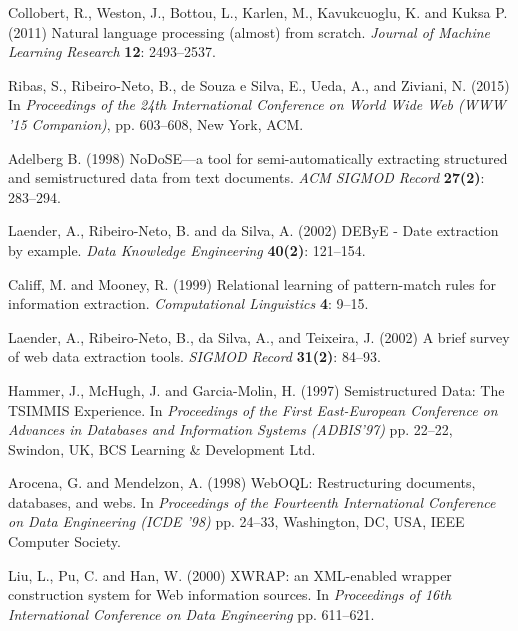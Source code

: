 \documentclass{nle}
\begin{document}
\begin{thebibliography}{}
Collobert, R., Weston, J., Bottou, L., Karlen, M., Kavukcuoglu, K. and Kuksa P. (2011)
Natural language processing (almost) from scratch.
{\it Journal of Machine Learning Research}
{\bf 12}: 2493--2537.

Ribas, S., Ribeiro-Neto, B., de Souza e Silva, E., Ueda, A., and Ziviani, N. (2015)
In {\it Proceedings of the 24th International Conference on World Wide Web (WWW '15 Companion)}, 
pp. 603--608, New York, ACM.

Adelberg B. (1998)
NoDoSE---a tool for semi-automatically extracting structured and semistructured data from text documents.
{\it ACM SIGMOD Record} 
{\bf 27(2)}: 283--294.

Laender, A., Ribeiro-Neto, B. and da Silva, A. (2002)
DEByE - Date extraction by example.
{\it Data Knowledge Engineering}
{\bf 40(2)}: 121--154.

Califf, M. and Mooney, R. (1999)
Relational learning of pattern-match rules for information extraction.
{\it Computational Linguistics}
{\bf 4}: 9--15.

Laender, A., Ribeiro-Neto, B., da Silva, A., and Teixeira, J. (2002)
A brief survey of web data extraction tools.
{\it SIGMOD Record}
{\bf 31(2)}: 84--93.

Hammer, J., McHugh, J. and Garcia-Molin, H. (1997)
Semistructured Data: The TSIMMIS Experience.
In {\it Proceedings of the First East-European Conference on Advances in Databases and Information Systems (ADBIS'97)}
pp. 22--22, Swindon, UK, BCS Learning \& Development Ltd.

Arocena, G. and Mendelzon, A. (1998)
WebOQL: Restructuring documents, databases, and webs.
In {\it Proceedings of the Fourteenth International Conference on Data Engineering (ICDE '98)}
pp. 24--33, Washington, DC, USA, IEEE Computer Society.

Liu, L., Pu, C. and Han, W. (2000)
XWRAP: an XML-enabled wrapper construction system for Web information sources.
In {\it Proceedings of 16th International Conference on Data Engineering}
pp. 611--621.


\end{thebibliography}
\end{document}
